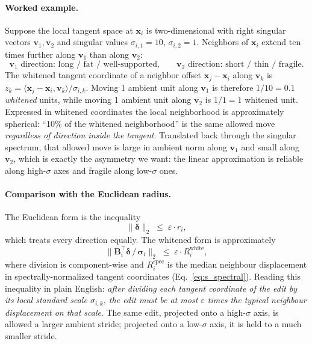 \paragraph{Worked example.}
Suppose the local tangent space at $\mathbf{x}_i$ is two-dimensional with right singular vectors $\mathbf{v}_1, \mathbf{v}_2$ and singular values $\sigma_{i,1} = 10$, $\sigma_{i,2} = 1$. Neighbors of $\mathbf{x}_i$ extend ten times further along $\mathbf{v}_1$ than along $\mathbf{v}_2$:
\[
\text{$\mathbf{v}_1$ direction: long / fat / well-supported,} \qquad
\text{$\mathbf{v}_2$ direction: short / thin / fragile.}
\]
The whitened tangent coordinate of a neighbor offset $\mathbf{x}_j - \mathbf{x}_i$ along $\mathbf{v}_k$ is
$z_k = \langle \mathbf{x}_j - \mathbf{x}_i, \mathbf{v}_k \rangle / \sigma_{i,k}$. Moving 1 ambient unit along $\mathbf{v}_1$ is therefore $1/10 = 0.1$ \emph{whitened} units, while moving 1 ambient unit along $\mathbf{v}_2$ is $1/1 = 1$ whitened unit. Expressed in whitened coordinates the local neighborhood is approximately spherical: ``10\% of the whitened neighborhood'' is the same allowed move \emph{regardless of direction inside the tangent}. Translated back through the singular spectrum, that allowed move is large in ambient norm along $\mathbf{v}_1$ and small along $\mathbf{v}_2$, which is exactly the asymmetry we want: the linear approximation is reliable along high-$\sigma$ axes and fragile along low-$\sigma$ ones.

\paragraph{Comparison with the Euclidean radius.}
The Euclidean form is the inequality
\[
\| \boldsymbol{\delta} \|_2 \;\leq\; \varepsilon \cdot r_i,
\]
which treats every direction equally. The whitened form is approximately
\[
\Big\| \mathbf{B}_i^\top \boldsymbol{\delta} \,/\, \boldsymbol\sigma_i \Big\|_2 \;\leq\; \varepsilon \cdot R_i^{\mathrm{white}},
\]
where division is component-wise and $R_i^{\mathrm{spec}}$ is the median neighbour displacement in spectrally-normalized tangent coordinates (Eq.~\ref{eq:s_spectral}). Reading this inequality in plain English: \emph{after dividing each tangent coordinate of the edit by its local standard scale $\sigma_{i,k}$, the edit must be at most $\varepsilon$ times the typical neighbour displacement on that scale}. The same edit, projected onto a high-$\sigma$ axis, is allowed a larger ambient stride; projected onto a low-$\sigma$ axis, it is held to a much smaller stride.


